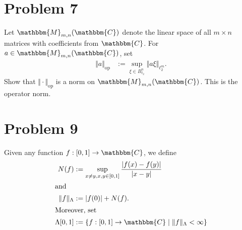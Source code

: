 \documentclass[8pt]{extarticle}
\begin{document}
  \section{Problem 7}%
  Let $\mathbbm{M}_{m,n}(\mathbbm{C})$ denote the linear space of all $m\times n$ matrices with coefficients from $\mathbbm{C}$. For $a\in \mathbbm{M}_{m,n}(\mathbbm{C})$, set
  \begin{align*}
    \Vert a\Vert_{\text{op}} &:= \sup_{\xi\in B_{\ell_2}^n}\Vert a\xi\Vert_{\ell_2^{m}}.
  \end{align*}
  Show that $\Vert \cdot \Vert_{\text{op}}$ is a norm on $\mathbbm{M}_{m,n}(\mathbbm{C})$. This is the operator norm.
  \section{Problem 9}%
  Given any function $f: [0,1]\rightarrow \mathbbm{C}$, we define
  \begin{align*}
    N(f) &:= \sup_{x\neq y, x,y\in[0,1]}\frac{|f(x)-f(y)|}{|x-y|}\\
    \shortintertext{and}
    \Vert f\Vert_{\Lambda} &:= |f(0)| + N(f).\\
    \shortintertext{Moreover, set}
    \Lambda[0,1] &:= \left\{f: [0,1]\rightarrow \mathbbm{C}\mid \Vert f\Vert_{\Lambda} < \infty\right\}
  \end{align*}
\end{document}
